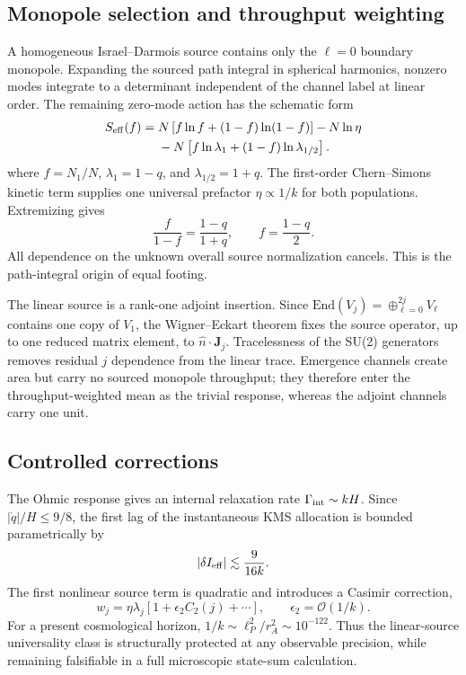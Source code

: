 \documentclass[aps,prd,twocolumn,10pt,superscriptaddress,nofootinbib]{revtex4-2}
\begin{document}
\subsection{Monopole selection and throughput weighting}

A homogeneous Israel--Darmois source contains only the $\ell=0$ boundary
monopole.  Expanding the sourced path integral in spherical harmonics,
nonzero modes integrate to a determinant independent of the channel label at
linear order.  The remaining zero-mode action has the schematic form
\begin{align}
S_{\rm eff}(f)
={}&N\left[f\ln f+(1-f)\ln(1-f)\right]-N\ln\eta
\notag\\
&-N\left[f\ln\lambda_1+(1-f)\ln\lambda_{1/2}\right].
\label{eq:app_zero_mode_action}
\end{align}
where $f=N_1/N$, $\lambda_1=1-q$, and
$\lambda_{1/2}=1+q$.  The first-order Chern--Simons kinetic term supplies
one universal prefactor $\eta\propto1/k$ for both populations.  Extremizing
gives
\begin{equation}
\frac{f}{1-f}=\frac{1-q}{1+q},
\qquad
f=\frac{1-q}{2}.
\label{eq:app_equal_footing}
\end{equation}
All dependence on the unknown overall source normalization cancels.  This is
the path-integral origin of equal footing.

The linear source is a rank-one adjoint insertion.  Since
$\mathrm{End}(V_j)=\oplus_{\ell=0}^{2j}V_\ell$ contains one copy of
$V_1$, the Wigner--Eckart theorem fixes the source operator, up to one
reduced matrix element, to $\hat n\cdot\mathbf J_j$.  Tracelessness of the
SU(2) generators removes residual $j$ dependence from the linear trace.
Emergence channels create area but carry no sourced monopole throughput;
they therefore enter the throughput-weighted mean as the trivial response,
whereas the adjoint channels carry one unit.

\subsection{Controlled corrections}

The Ohmic response gives an internal relaxation rate
$\Gamma_{\rm int}\sim kH$.  Since $|\dot q|/H\le9/8$, the first lag of the
instantaneous KMS allocation is bounded parametrically by
\begin{equation}
|\delta I_{\rm eff}|\lesssim\frac{9}{16k}.
\end{equation}
The first nonlinear source term is quadratic and introduces a Casimir
correction,
\begin{equation}
w_j=\eta\lambda_j\left[1+\epsilon_2C_2(j)+\cdots\right],
\qquad \epsilon_2=\mathcal O(1/k).
\end{equation}
For a present cosmological horizon, $1/k\sim\ell_P^2/r_A^2\sim10^{-122}$.
Thus the linear-source universality class is structurally protected at any
observable precision, while remaining falsifiable in a full microscopic
state-sum calculation.
\end{document}
